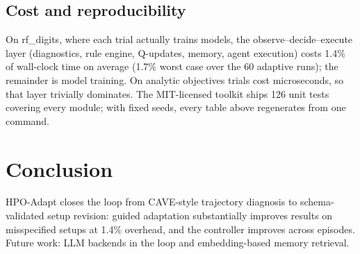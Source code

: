 \documentclass[10pt]{article}
\newcommand{\toolname}{HPO-Adapt}
\begin{document}
\subsection{Cost and reproducibility}

On rf\_digits, where each trial actually trains models, the
observe--decide--execute layer (diagnostics, rule engine, Q-updates,
memory, agent execution) costs 1.4\% of wall-clock time on average (1.7\%
worst case over the 60 adaptive runs); the remainder is model training.
On analytic objectives trials cost microseconds, so that layer trivially
dominates. The MIT-licensed toolkit ships 126 unit tests covering every
module; with fixed seeds, every table above regenerates from one command.

\section{Conclusion}
\label{sec:conclusion}

\toolname{} closes the loop from CAVE-style trajectory diagnosis to
schema-validated setup revision: guided adaptation substantially improves
results on misspecified setups at 1.4\% overhead, and the controller
improves across episodes. Future work: LLM backends in the loop and
embedding-based memory retrieval.



\end{document}
